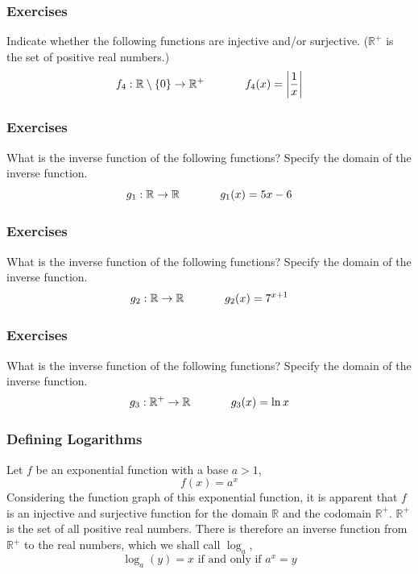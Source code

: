 \documentclass[xcolor=dvipsnames]{beamer}
\begin{document}
\begin{frame}
  \frametitle{Exercises}
  {\ubung} Indicate whether the following functions are injective
  and/or surjective. ($\mathbb{R}^{+}$ is the set of positive real
  numbers.)
\begin{equation}
  \label{eq:lohceuwe}
  f_{4}:\mathbb{R}\setminus\{0\}\rightarrow\mathbb{R}^{+}\hspace{.5in}f_{4}(x)=\left\vert\frac{1}{x}\right\vert
\end{equation}
\end{frame}

\begin{frame}
  \frametitle{Exercises}
  {\ubung} What is the inverse function of the following functions? Specify
the domain of the inverse function.
\begin{equation}
  \label{eq:saleicee}
  g_{1}:\mathbb{R}\rightarrow\mathbb{R}\hspace{.5in}g_{1}(x)=5x-6
\end{equation}
\end{frame}

\begin{frame}
  \frametitle{Exercises}
  {\ubung} What is the inverse function of the following functions? Specify
the domain of the inverse function.
\begin{equation}
  \label{eq:ahnaibio}
  g_{2}:\mathbb{R}\rightarrow\mathbb{R}\hspace{.5in}g_{2}(x)=7^{x+1}
\end{equation}
\end{frame}

\begin{frame}
  \frametitle{Exercises}
  {\ubung} What is the inverse function of the following functions? Specify
the domain of the inverse function.
\begin{equation}
  \label{eq:hegaijou}
  g_{3}:\mathbb{R}^{+}\rightarrow\mathbb{R}\hspace{.5in}g_{3}(x)=\ln{}x
\end{equation}
\end{frame}

\begin{frame}
  \frametitle{Defining Logarithms}
Let $f$ be an exponential function with a base $a>1$,
\begin{equation}
  \label{eq:ohzuiwah}
  f(x)=a^{x}
\end{equation}
Considering the function graph of this exponential function, it is
apparent that $f$ is an injective and surjective function for the
domain $\mathbb{R}$ and the codomain $\mathbb{R}^{+}$.
$\mathbb{R}^{+}$ is the set of all positive real numbers. There is
therefore an inverse function from $\mathbb{R}^{+}$ to the real
numbers, which we shall call $\log_{a}$,
\begin{equation}
  \label{eq:cievucha}
  \log_{a}(y)=x\mbox{ if and only if }a^{x}=y
\end{equation}
\end{frame}
\end{document}
